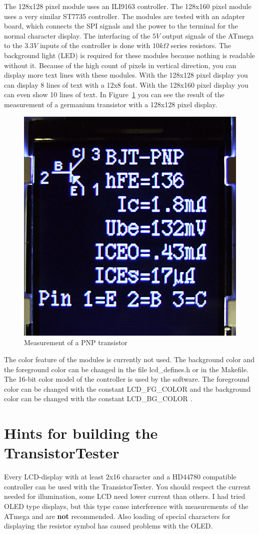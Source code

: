 The 128x128 pixel module uses an ILI9163 controller.
The 128x160 pixel module uses a very similar ST7735 controller.
The modules are tested with an adapter board, which connects the
SPI signals and the power to the terminal for the normal character display.
The interfacing of the \(5V\) output signals of the ATmega to the \(3.3V\) inputs of the controller
is done with \(10k\Omega\) series resistors.
The background light (LED) is required for these modules because nothing is readable without it.
Because of the high count of pixels in vertical direction, you can display more text lines with these modules.
With the 128x128 pixel display you can display 8 lines of text with a 12x8 font.
With the 128x160 pixel display you can even show 10 lines of text.
In Figure~\ref{fig:Color_PNP} you can see the result of the measurement of a germanium transistor
with a 128x128 pixel display.

\begin{figure}[H]
\centering
\includegraphics[width=.46\textwidth]{../PNG/Color_PNP_ILI9163.jpg}
\caption{Measurement of a PNP transistor}
\label{fig:Color_PNP}
\end{figure}

The color feature of the modules is currently not used.
The background color and the foreground color can be changed in the file lcd\_defines.h or
in the Makefile.
The 16-bit color model of the controller is used by the software.
The foreground color can be changed with the constant LCD\_FG\_COLOR and
the background color can be changed with the constant LCD\_BG\_COLOR .


\section{Hints for building the TransistorTester}
Every LCD-display with at least 2x16 character and a HD44780 compatible controller
can be used with the TransistorTester. You should respect the current needed for
illumination, some LCD need lower current than others.
I had tried OLED type displays, but this type cause interference with measurements
of the ATmega and are \textbf {not} recommended. Also loading of special characters
for displaying the resistor symbol has caused problems with the OLED.

